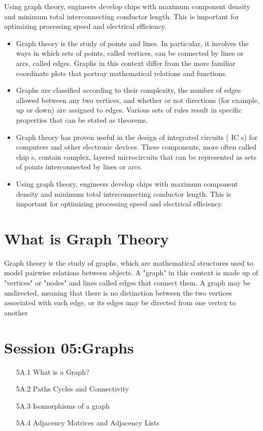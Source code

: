 \documentclass[]{report}
\begin{document}
Using graph theory, engineers develop chips with maximum component density and minimum total interconnecting conductor length. This is important for optimizing processing speed and electrical efficiency.

\begin{itemize}
\item Graph theory is the study of points and lines. In particular, it involves the ways in which sets of points, called vertices, can be connected by lines or arcs, called edges. Graphs in this context differ from the more familiar coordinate plots that portray mathematical relations and functions.

\item Graphs are classified according to their complexity, the number of edges allowed between any two vertices, and whether or not directions (for example, up or down) are assigned to edges. Various sets of rules result in specific properties that can be stated as theorems.

\item Graph theory has proven useful in the design of integrated circuits ( IC s) for computers and other electronic devices. These components, more often called chip s, contain complex, layered microcircuits that can be represented as sets of points interconnected by lines or arcs. 

\item Using graph theory, engineers develop chips with maximum component density and minimum total interconnecting conductor length. This is important for optimizing processing speed and electrical efficiency.
\end{itemize}

\section*{What is Graph Theory}
Graph theory is the study of graphs, which are mathematical structures used to model pairwise relations between objects. A "graph" in this context is made up of "vertices" or "nodes" and lines called edges that connect them. A graph may be undirected, meaning that there is no distinction between the two vertices associated with each edge, or its edges may be directed from one vertex to another

\section*{Session 05:Graphs}
\begin{itemize}
\item[5A.1] What is a Graph?
\item[5A.2] Paths Cycles and Connectivity
\item[5A.3] Isomorphisms of a graph
\item[5A.4] Adjacency Matrices and Adjacency Lists
\end{itemize}
\end{document}
